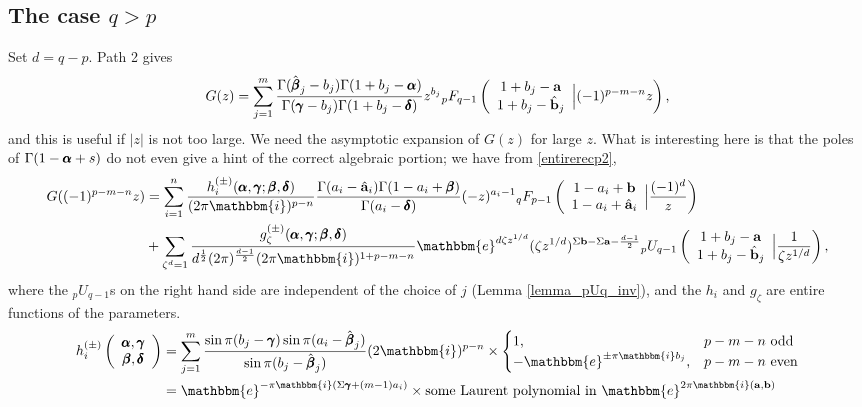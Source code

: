 \documentclass[12pt]{article}
\newcommand{\ee}[0] {\mathbbm{e}}
\newcommand{\ii}[0] {\mathbbm{i}}
\numberwithin{equation}{section}
\newcommand{\FF}[6] {{}_{#1}{#2}_{#3} \left( \begin{array}{c} #4 \\ #5 \end{array} \Big| {#6}  \right)}
\newcommand{\bfa}[0] {\mathbf{a}}
\newcommand{\bfb}[0] {\mathbf{b}}
\begin{document}
\subsection{The case $q>p$}
Set $d = q-p$. Path 2 gives
\begin{equation}
\label{eq_Gpath2}
G(z) = \sum_{j=1}^{m} \frac{\Gamma(\hat{\bfbeta}_j - b_j)\Gamma(1+b_j-\bfalpha)}{\Gamma(\bfgamma-b_j)\Gamma(1+b_j-\bfdelta)} z^{b_j}\FF{p}{F}{q-1}{1+b_j-\bfa}{1+b_j-\hat{\bfb}_j}{(-1)^{p-m-n}z}\text{,}
\end{equation}
and this is useful if $|z|$ is not too large. We need the asymptotic expansion of $G(z)$ for large $z$. What is interesting here is that the poles of $\Gamma(1-\pmb{\alpha}+s)$ do not even give a hint of the correct algebraic portion; we have from \eqref{entirerecp2},
\begin{align*}
G((-1)^{p-m-n}z) &= \sum_{i=1}^{n} \frac{h_{i}^{(\pm)}(\bfalpha, \bfgamma; \bfbeta, \bfdelta)}{(2\pi \ii)^{p-n} } \frac{\Gamma(a_i-\hat{\bfa}_i)\Gamma(1-a_i+\bfbeta)}{\Gamma(a_i-\bfdelta)} (-z)^{a_i-1}\FF{q}{F}{p-1}{1-a_i+\bfb}{1-a_i+\hat{\bfa}_i}{\frac{(-1)^{d}}{z}}\\
&+\sum_{\zeta^d=1} \frac{g_{\zeta}^{(\pm)}(\bfalpha, \bfgamma; \bfbeta, \bfdelta)}{d^{\frac{1}{2}} (2\pi)^{\frac{d-1}{2}} (2\pi \ii)^{1+p-m-n}} \ee^{d \zeta z^{1/d}}(\zeta z^{1/d})^{\Sigma \bfb - \Sigma \bfa - \frac{d-1}{2}} \FF{p}{U}{q-1}{1+b_j-\bfa}{1+b_j-\hat{\bfb}_j}{\frac{1}{\zeta z^{1/d}}}\text{,}
\end{align*}
where the ${}_p U_{q-1}$s on the right hand side are independent of the choice of $j$ (Lemma \ref{lemma_pUq_inv}), and the $h_i$ and $g_{\zeta}$ are entire functions of the parameters.
\begin{align*}
h_{i}^{(\pm)}\left(\begin{array}{c} \bfalpha, \bfgamma \\ \bfbeta, \bfdelta \end{array}\right) &= \sum_{j=1}^{m} \frac{\sin \pi (b_j-\bfgamma) \sin \pi (a_i-\hat{\bfbeta}_j)}{\sin \pi (b_j-\hat{\bfbeta}_j)} (2 \ii)^{p-n} \times \begin{cases} 1\text{,}& p-m-n \text{ odd}\\
-\ee^{\pm \pi \ii b_j}\text{,}& p-m-n \text{ even}\end{cases}\\
&= \ee^{-\pi \ii (\Sigma \bfgamma + (m-1) a_i)} \times \text{some Laurent polynomial in } \ee^{2\pi \ii (\bfa, \bfb)}
\end{align*}
\end{document}
